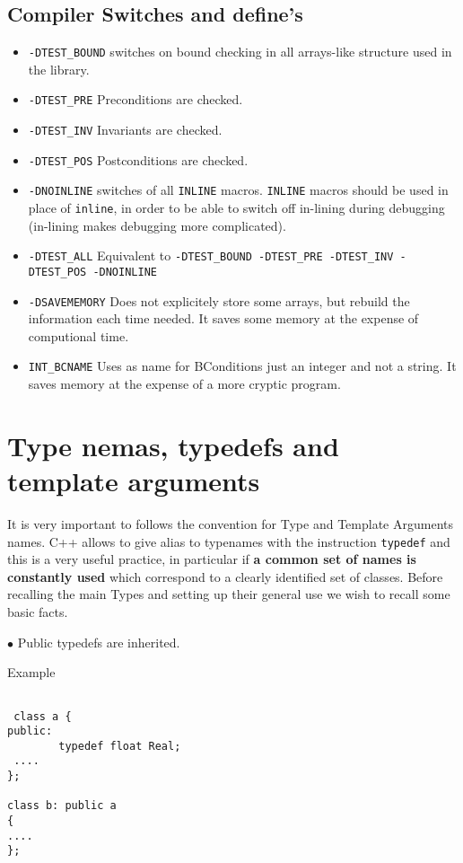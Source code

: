 \subsection{Compiler Switches and define's}
\begin{itemize}
\item \texttt{-DTEST\_BOUND}  switches on bound checking in all
  arrays-like structure used in the library.
\item\texttt{-DTEST\_PRE} Preconditions are checked.
\item\texttt{-DTEST\_INV} Invariants are checked.
\item\texttt{-DTEST\_POS} Postconditions are checked.
\item \texttt{-DNOINLINE} switches of all \texttt{INLINE} macros.
  \texttt{INLINE} macros should be used in place of \texttt{inline}, in
  order to be able to switch off in-lining during debugging (in-lining
  makes debugging more complicated).
\item\texttt{-DTEST\_ALL} Equivalent to \texttt{-DTEST\_BOUND -DTEST\_PRE -DTEST\_INV
    -DTEST\_POS -DNOINLINE}
\item \texttt{-DSAVEMEMORY} Does not explicitely store some arrays, but rebuild the information
each time needed. It saves some memory at the expense of computional time.
\item  \texttt{INT\_BCNAME} Uses as name for BConditions just an integer and not
  a string. It saves memory at the expense of a more cryptic program.
\end{itemize}

\section{Type nemas, typedefs and template arguments}

It is very important to follows the convention for Type and Template
Arguments names. C++ allows to give alias to typenames with the
instruction \texttt{typedef} and this is a very useful practice, in
particular if \textbf{a common set of names is constantly used} which
correspond to a clearly identified set of classes. Before recalling the
main Types and setting up their general use we wish to recall some basic 
facts.

$\bullet$ Public typedefs are inherited.

Example
\begin{verbatim}

 class a {
public:
        typedef float Real;
 ....
};

class b: public a
{
....
};
\end{verbatim}

